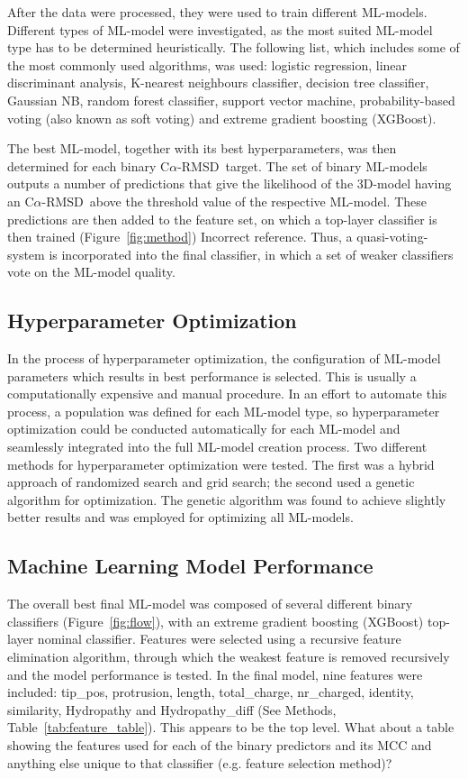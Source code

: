 \documentclass[12pt]{article}
\newcommand{\carmsd}{\mbox{C$\alpha$-RMSD}}
\newcommand{\lilian}[1]{ {\color{red}{\bfseries Lilian:} #1}}
\begin{document}
After the data were processed, they were used to train different
ML-models. Different types of ML-model were investigated, as the most
suited ML-model type has to be determined heuristically. 
The following list, which includes some of the most commonly used
algorithms, was used: logistic regression, linear discriminant analysis,
K-nearest neighbours classifier, decision tree classifier, Gaussian
NB, random forest classifier, support vector machine,
probability-based voting (also known as soft voting) and extreme
gradient boosting (XGBoost)\cite{Chen2016}.

The best ML-model, together with its best hyperparameters, was then determined for
each binary \carmsd\ target. The set of binary ML-models outputs a number of
predictions that give the likelihood of the 3D-model having an \carmsd\ above
the threshold value of the respective ML-model. These predictions are
then added to the feature set, on which a top-layer classifier is then
trained (Figure~\ref{fig:method})\lilian{Incorrect reference}.
Thus, a quasi-voting-system is incorporated into the final
classifier, in which a set of weaker classifiers vote on the ML-model
quality.

\subsection{Hyperparameter Optimization}
In the process of hyperparameter optimization, the configuration of
ML-model parameters which results in best performance is selected. This
is usually a computationally expensive and manual procedure.
In an effort to automate this process, a population was defined for
each ML-model type, so hyperparameter optimization could be conducted
automatically for each ML-model and seamlessly integrated into the full
ML-model creation process. Two different methods for hyperparameter
optimization were tested. The first was a hybrid approach of randomized
search and grid search; the second used a genetic algorithm for
optimization. The genetic algorithm was found to achieve slightly
better results and was employed for optimizing all ML-models.

\subsection{Machine Learning Model Performance}
The overall best final ML-model was composed of several different binary
classifiers (Figure~\ref{fig:flow}), with an extreme gradient boosting (XGBoost) top-layer
nominal classifier. Features were selected using a recursive feature
elimination algorithm, through which the weakest feature is removed
recursively and the model performance is tested. In the final model, nine
features were included: tip\_pos, protrusion, length, total\_charge, nr\_charged,
identity, similarity, Hydropathy and Hydropathy\_diff
(See Methods, Table~\ref{tab:feature_table}).
\lilian{This appears to be the top level. What about a table showing the features used for each of the binary predictors and its MCC and anything else unique to that classifier (e.g. feature selection method)?}
\end{document}
